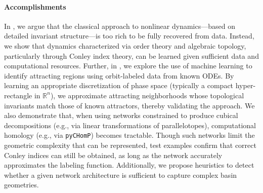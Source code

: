 \documentclass[letterpaper,11pt]{article}
\begin{document}
\paragraph{Accomplishments}

In \cite{gameiro2025rigorouslycharacterizingdynamicsmachine}, we argue that the classical approach to nonlinear dynamics—based on detailed invariant structure—is too rich to be fully recovered from data.
Instead, we show that dynamics characterized via order theory and algebraic topology, particularly through Conley index theory, can be learned given sufficient data and computational resources.
Further, in \cite{gameiro2025datadrivenidentificationattractorsusing}, we explore the use of machine learning to identify attracting regions using orbit-labeled data from known ODEs.
By learning an appropriate discretization of phase space (typically a compact hyper-rectangle in $\mathbb{R}^n$), we approximate attracting neighborhoods whose topological invariants match those of known attractors, thereby validating the approach.
We also demonstrate that, when using networks constrained to produce cubical decompositions (e.g., via linear transformations of parallelotopes), computational homology (e.g., via \texttt{pyCHomP}) becomes tractable.
Though such networks limit the geometric complexity that can be represented, test examples confirm that correct Conley indices can still be obtained, as long as the network accurately approximates the labeling function.
Additionally, we propose heuristics to detect whether a given network architecture is sufficient to capture complex basin geometries.
\end{document}
